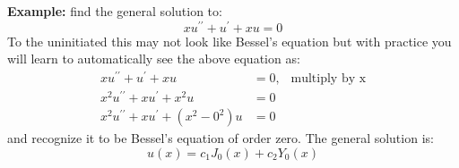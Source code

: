\vspace{1.0cm}

\noindent\textbf{Example:} find the general solution to:
\begin{equation*}
xu^{\prime \prime} + u^{\prime} + xu = 0
\end{equation*}
To the uninitiated this may not look like Bessel's equation but with practice you will learn to automatically see the above equation as: 
\begin{align*}
xu^{\prime \prime} + u^{\prime} + xu &= 0, \ \ \text{ multiply by x} \\
x^2u^{\prime \prime} + xu^{\prime} + x^2u &= 0 \\
x^2u^{\prime \prime} + xu^{\prime} + \left(x^2-0^2\right)u &= 0
\end{align*}
and recognize it to be Bessel's equation of order zero.  The general solution is:
\begin{equation*}
u(x) = c_1J_0(x) + c_2Y_0(x)
\end{equation*}
